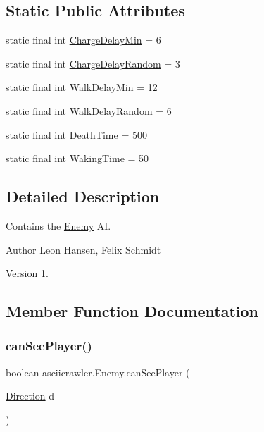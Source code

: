 \subsection*{Static Public Attributes}
\begin{DoxyCompactItemize}
\item 
static final int \hyperlink{classasciicrawler_1_1Enemy_a68c41f5b3ff03ce66a0a7748c6dcae31}{Charge\+Delay\+Min} = 6
\item 
static final int \hyperlink{classasciicrawler_1_1Enemy_a5d4281f4774665c377922b28bc53a142}{Charge\+Delay\+Random} = 3
\item 
static final int \hyperlink{classasciicrawler_1_1Enemy_a90ed20929053611dcb72a406b51d38c7}{Walk\+Delay\+Min} = 12
\item 
static final int \hyperlink{classasciicrawler_1_1Enemy_ab726ddd8887f94387edf105358a034a3}{Walk\+Delay\+Random} = 6
\item 
static final int \hyperlink{classasciicrawler_1_1Enemy_ac44d10fa43eb6b9507eb8876f52c0d28}{Death\+Time} = 500
\item 
static final int \hyperlink{classasciicrawler_1_1Enemy_a03cbf40a5f16e3023b00ece3bfe67554}{Waking\+Time} = 50
\end{DoxyCompactItemize}


\subsection{Detailed Description}
Contains the \hyperlink{classasciicrawler_1_1Enemy}{Enemy} AI. 

\begin{DoxyAuthor}{Author}
Leon Hansen, Felix Schmidt 
\end{DoxyAuthor}
\begin{DoxyVersion}{Version}
1. 
\end{DoxyVersion}


\subsection{Member Function Documentation}
\mbox{\label{classasciicrawler_1_1Enemy_a278cb592e872c27a9faa8932f1c14819}} 
\subsubsection{\texorpdfstring{can\+See\+Player()}{canSeePlayer()}}
{\footnotesize\ttfamily boolean asciicrawler.\+Enemy.\+can\+See\+Player (\begin{DoxyParamCaption}\item[{\hyperlink{enumasciicrawler_1_1Direction}{Direction}}]{d }\end{DoxyParamCaption})\hspace{0.3cm}{\ttfamily [inline]}}

